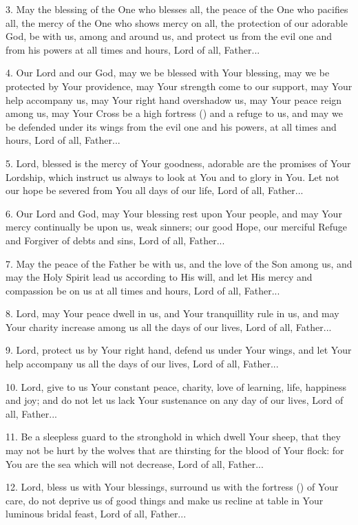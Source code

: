 \documentclass[12pt,twoside,a5paper]{article}
\begin{document}
3. May the blessing of the One who blesses all, the peace of the One who pacifies all, the mercy of the One who shows mercy on all, the protection of our adorable God, be with us, among and around us, and protect us from the evil one and from his powers at all times and hours, Lord of all, Father...

4. Our Lord and our God, may we be blessed with Your blessing, may we be protected by Your providence, may Your strength come to our support, may Your help accompany us, may Your right hand overshadow us, may Your peace reign among us, may Your Cross be a high fortress () and a refuge to us, and may we be defended under its wings from the evil one and his powers, at all times and hours, Lord of all, Father...

5. Lord, blessed is the mercy of Your goodness, adorable are the promises of Your Lordship, which instruct us always to look at You and to glory in You. Let not our hope be severed from You all days of our life, Lord of all, Father...

6. Our Lord and God, may Your blessing rest upon Your people, and may Your mercy continually be upon us, weak sinners; our good Hope, our merciful Refuge and Forgiver of debts and sins, Lord of all, Father...

7. May the peace of the Father be with us, and the love of the Son among us, and may the Holy Spirit lead us according to His will, and let His mercy and compassion be on us at all times and hours, Lord of all, Father...

8. Lord, may Your peace dwell in us, and Your tranquillity rule in us, and may Your charity increase among us all the days of our lives, Lord of all, Father...

9. Lord, protect us by Your right hand, defend us under Your wings, and let Your help accompany us all the days of our lives, Lord of all, Father...

10. Lord, give to us Your constant peace, charity, love of learning, life, happiness and joy; and do not let us lack Your sustenance on any day of our lives, Lord of all, Father...

11. Be a sleepless guard to the stronghold in which dwell Your sheep, that they may not be hurt by the wolves that are thirsting for the blood of Your flock: for You are the sea which will not decrease, Lord of all, Father...

12. Lord, bless us with Your blessings, surround us with the fortress () of Your care, do not deprive us of good things and make us recline at table in Your luminous bridal feast, Lord of all, Father...
\end{document}
